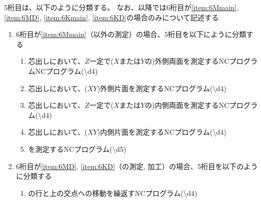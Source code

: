 \clearpage
5桁目は、以下のように分類する。
なお、以降では6桁目が\ref{item:6Mmain}, \ref{item:6MD}, \ref{item:6Kmain}, \ref{item:6KD}の場合のみについて記述する
\begin{enumerate}[label=\alph*)]
\item 6桁目が\ref{item:6Mmain}（\Dimple 以外の測定）の場合、5桁目を以下にように分類する
  \begin{enumerate}[label=\arabic*., ref=\arabic*, start=1]
  \item%
    芯出しにおいて、$Z$一定で($X$または$Y$の)外側両面を測定するNCプログラムNCプログラム({\textbackslash d{4}})
  \item%
    芯出しにおいて、($XY$)外側片面を測定するNCプログラム({\textbackslash d{4}})
  \item%
    芯出しにおいて、$Z$一定で($X$または$Y$の)内側両面を測定するNCプログラム({\textbackslash d{4}})
  \item%
    芯出しにおいて、($XY$)内側片面を測定するNCプログラム({\textbackslash d{4}})
  \item%
    \expandafterindex{\yomiCenterlineEndFaceDifMeasurement@\nameCenterlineEndFaceDifMeasurement}\nameCenterlineEndFaceDif を測定するNCプログラム({\textbackslash d{5}})
  \end{enumerate}
\item 6桁目が\ref{item:6MD}, \ref{item:6KD}（\Dimple の測定, 加工）の場合、5桁目を以下のように分類する
  \begin{enumerate}[label=\arabic*., ref=\arabic*]
  \item \Dimple の行と\CenterCurvatureLine 上の交点への移動を繰返すNCプログラム({\textbackslash d{4}})

\end{enumerate}
\end{enumerate}
